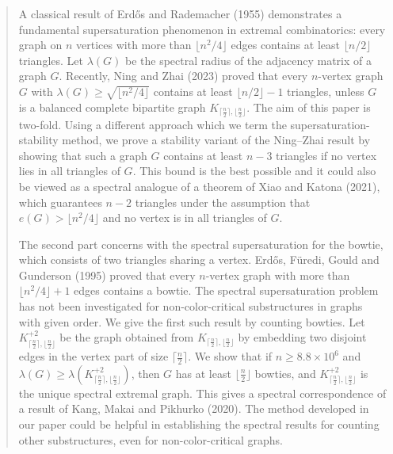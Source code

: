 \documentclass[11pt]{article}
\begin{document}
\begin{abstract}
A classical result of Erd\H{o}s and Rademacher (1955) demonstrates a fundamental supersaturation phenomenon in extremal combinatorics: every graph on $n$ vertices with more than $\lfloor n^2/4\rfloor$ edges contains at least $\lfloor n/2 \rfloor$ triangles.  
Let $\lambda (G)$ be the spectral radius of the adjacency matrix of a graph $G$. 
Recently, Ning and Zhai (2023) proved that 
every $n$-vertex graph $G$ with $\lambda (G) \ge 
\sqrt{\lfloor n^2/4\rfloor}$ contains at least $\lfloor n/2\rfloor -1$ triangles, 
unless $G$ is a balanced complete bipartite graph $K_{\lceil \frac{n}{2} \rceil, \lfloor \frac{n}{2} \rfloor}$. 
The aim of this paper is two-fold. 
Using a different approach which we term 
the supersaturation-stability method, 
we prove a stability variant of the Ning--Zhai result by showing that such a graph $G$ contains at least $n-3$ triangles if no vertex lies in all triangles of $G$. This bound is the best possible and it could also be viewed as a spectral analogue of a theorem of  Xiao and Katona (2021), which guarantees $n-2$ triangles under the assumption that $e(G)> \lfloor n^2/4\rfloor$ and  no vertex is in all triangles of $G$. 

The second part concerns with the spectral supersaturation for the bowtie, which consists of two triangles sharing a vertex. 
Erd\H{o}s, F\"{u}redi, Gould and Gunderson (1995) proved 
that every $n$-vertex graph with more than $\lfloor n^2/4\rfloor +1$ edges contains a bowtie.   
The spectral supersaturation problem has not been investigated for non-color-critical substructures in graphs with given order. 
We give the first such result by counting bowties.   
Let $K_{\lceil \frac{n}{2} \rceil, \lfloor \frac{n}{2} \rfloor}^{+2}$ 
be the graph obtained from $K_{\lceil \frac{n}{2} \rceil, \lfloor \frac{n}{2} \rfloor}$ by embedding two disjoint edges in the vertex part of size $\lceil \frac{n}{2} \rceil$.  We show that if $n\ge 8.8 \times 10^6$ and 
$\lambda (G)\ge \lambda (K_{\lceil \frac{n}{2} \rceil, \lfloor \frac{n}{2} \rfloor}^{+2})$, then $G$ has at least $\lfloor \frac{n}{2} \rfloor$  bowties,  
and $K_{\lceil \frac{n}{2} \rceil, \lfloor \frac{n}{2} \rfloor}^{+2}$ is the unique spectral extremal graph.  
This gives a spectral correspondence of a result of Kang, Makai and Pikhurko (2020). 
The method developed in our paper could be helpful in establishing the spectral results for counting other substructures, even for non-color-critical graphs.  
 \end{abstract}
\end{document}
